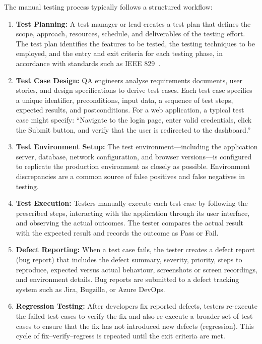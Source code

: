The manual testing process typically follows a structured workflow:

\begin{enumerate}
    \item \textbf{Test Planning:} A test manager or lead creates a test plan that defines the scope, approach, resources, schedule, and deliverables of the testing effort. The test plan identifies the features to be tested, the testing techniques to be employed, and the entry and exit criteria for each testing phase, in accordance with standards such as IEEE 829~\cite{ieee829}.

    \item \textbf{Test Case Design:} QA engineers analyse requirements documents, user stories, and design specifications to derive test cases. Each test case specifies a unique identifier, preconditions, input data, a sequence of test steps, expected results, and postconditions. For a web application, a typical test case might specify: ``Navigate to the login page, enter valid credentials, click the Submit button, and verify that the user is redirected to the dashboard.''

    \item \textbf{Test Environment Setup:} The test environment---including the application server, database, network configuration, and browser versions---is configured to replicate the production environment as closely as possible. Environment discrepancies are a common source of false positives and false negatives in testing.

    \item \textbf{Test Execution:} Testers manually execute each test case by following the prescribed steps, interacting with the application through its user interface, and observing the actual outcomes. The tester compares the actual result with the expected result and records the outcome as Pass or Fail.

    \item \textbf{Defect Reporting:} When a test case fails, the tester creates a defect report (bug report) that includes the defect summary, severity, priority, steps to reproduce, expected versus actual behaviour, screenshots or screen recordings, and environment details. Bug reports are submitted to a defect tracking system such as Jira, Bugzilla, or Azure DevOps.

    \item \textbf{Regression Testing:} After developers fix reported defects, testers re-execute the failed test cases to verify the fix and also re-execute a broader set of test cases to ensure that the fix has not introduced new defects (regression). This cycle of fix--verify--regress is repeated until the exit criteria are met.
\end{enumerate}

